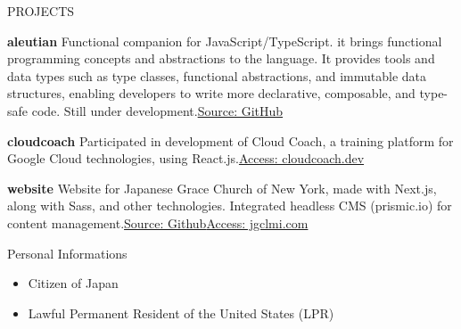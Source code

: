 \documentclass{resume}
\begin{document}
\begin{rSection}{PROJECTS}
\vspace{-1.25em}
\item \textbf{aleutian} {Functional companion for JavaScript/TypeScript. it brings functional programming concepts and abstractions to the language. It provides tools and data types such as type classes, functional abstractions, and immutable data structures, enabling developers to write more declarative, composable, and type-safe code. Still under development.\hspace{1em}\href{https://github.com/shunueda/aleutian}{Source: GitHub}}
\item \textbf{cloudcoach} {Participated in development of Cloud Coach, a training platform for Google Cloud technologies, using React.js.\hspace{1em}\href{https://cloudcoach.dev}{Access: cloudcoach.dev}}
\item \textbf{website} {
    Website for Japanese Grace Church of New York, made with Next.js, along with Sass, and other technologies. Integrated headless CMS (prismic.io) for content management.\hspace{1em}\href{https://github.com/MegumiChurch/website}{Source: Github}\hspace{1em}\href{https://www.jgclmi.com}{Access: jgclmi.com}
}
\end{rSection} 

\begin{rSection}{Personal Informations} 
\begin{itemize}
    \item Citizen of Japan
    \item Lawful Permanent Resident of the United States (LPR)
\end{itemize}


\end{rSection}
\end{document}
